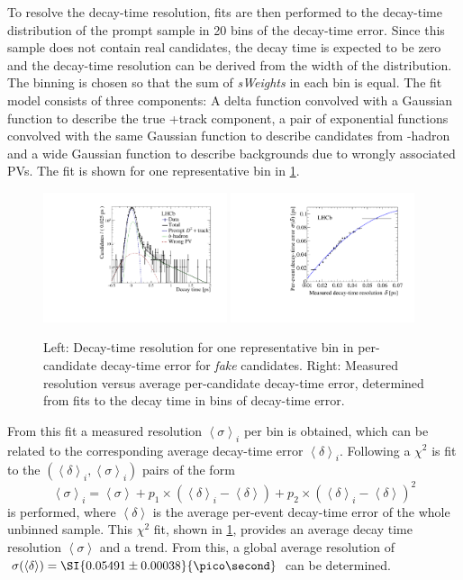 To resolve the decay-time resolution, fits are then performed to the decay-time distribution of the prompt sample in \num{20} bins of the decay-time error.
Since this sample does not contain real \Bz candidates, the decay time is expected to be zero and the decay-time resolution can be derived from the width of the distribution.
The binning is chosen so that the sum of \emph{sWeights} in each bin is equal.
The fit model consists of three components: A delta function convolved with a Gaussian function to describe the true \Dpm+track component, a pair of exponential functions convolved with the same Gaussian function to describe candidates from \bquark-hadron and a wide Gaussian function to describe backgrounds due to wrongly associated \ac{PV}s.
The fit is shown for one representative bin in \cref{fig:resolutionRepresentativeBin}.
\begin{figure}[tbp]
    \centering
    \includegraphics[width=0.48\textwidth]{09TimeFit/figs/resolution_Bin15.pdf}
    \includegraphics[width=0.48\textwidth]{09TimeFit/figs/resolution_chi2Fit.pdf}
    \caption{Left: Decay-time resolution for one representative bin in per-candidate decay-time error for \emph{fake} \Bz candidates.
    Right: Measured resolution versus average per-candidate decay-time error, determined from fits to the decay time in bins of decay-time error.}
    \label{fig:resolutionRepresentativeBin}
\end{figure}
From this fit a measured resolution $\left<\sigma\right>_i$ per bin is obtained, which can be related to the corresponding average decay-time error $\left<\delta\right>_i$.
Following a $\chi^2$ is fit to the $(\left<\delta\right>_i, \left<\sigma\right>_i)$ pairs of the form
\begin{equation}
\left<\sigma\right>_i=\left<\sigma\right>+p_1\times\left(\left<\delta\right>_i-\left<\delta\right>\right)+p_2\times\left(\left<\delta\right>_i-\left<\delta\right>\right)^2
\end{equation}
is performed, where $\left<\delta\right>$ is the average per-event decay-time error of the whole unbinned sample.
This $\chi^2$ fit, shown in \cref{fig:resolutionRepresentativeBin}, provides an average decay time resolution $\left<\sigma\right>$ and a trend.
From this, a global average resolution of \mbox{$\sigma\!\left(\left<\delta\right>\right)=\SI{0.05491\pm0.00038}{\pico\second}$} can be determined.

